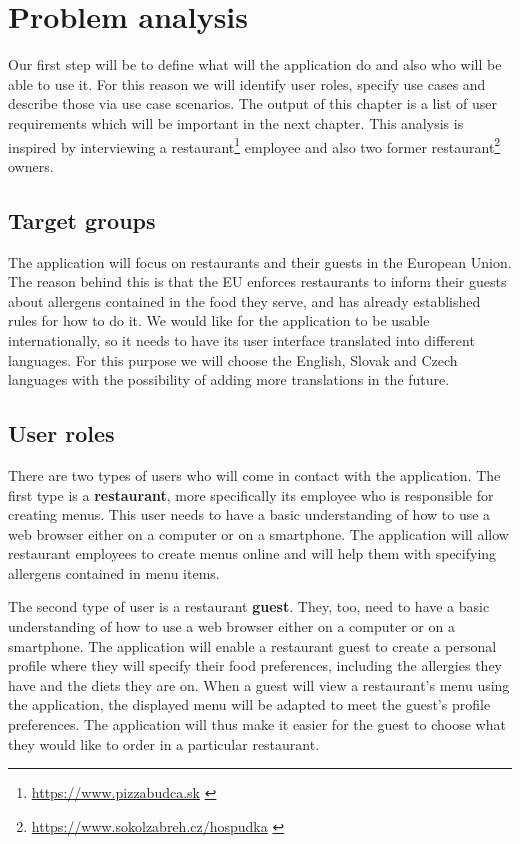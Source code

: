 \chapter{Problem analysis}
Our first step will be to define what will the application do and also who will be able to use it.
For this reason we will identify user roles, specify use cases and describe those via use case scenarios.
The output of this chapter is a list of user requirements which will be important in the next chapter.
This analysis is inspired by interviewing a restaurant\footnote{\url{https://www.pizzabudca.sk}  \label{fnlabel}} employee and also two former restaurant\footnote{\url{https://www.sokolzabreh.cz/hospudka}  \label{fnlabel}} owners.

\section{Target groups}
The application will focus on restaurants and their guests in the European Union.
The reason behind this is that the EU enforces restaurants to inform their guests about allergens contained in the food they serve, and has already established rules for how to do it.
We would like for the application to be usable internationally, so it needs to have its user interface translated into different languages.
For this purpose we will choose the English, Slovak and Czech languages with the possibility of adding more translations in the future.

\section{User roles}
There are two types of users who will come in contact with the application.
The first type is a \textbf{restaurant}, more specifically its employee who is responsible for creating menus.
This user needs to have a basic understanding of how to use a web browser either on a computer or on a smartphone.
The application will allow restaurant employees to create menus online and will help them with specifying allergens contained in menu items.

The second type of user is a restaurant \textbf{guest}.
They, too, need to have a basic understanding of how to use a web browser either on a computer or on a smartphone.
The application will enable a restaurant guest to create a personal profile where they will specify their food preferences, including the allergies they have and the diets they are on.
When a guest will view a restaurant's menu using the application, the displayed menu will be adapted to meet the guest's profile preferences.
The application will thus make it easier for the guest to choose what they would like to order in a particular restaurant.

